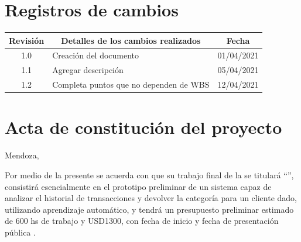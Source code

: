 \documentclass[11pt]{charter}
\begin{document}
\maketitle
\thispagestyle{empty}
\pagebreak


\thispagestyle{empty}
{\setlength{\parskip}{0pt}
\tableofcontents{}
}
\pagebreak


\section{Registros de cambios}
\label{sec:registro}


\begin{table}[ht]
\label{tab:registro}
\centering
\begin{tabularx}{\linewidth}{@{}|c|X|c|@{}}
\hline
\rowcolor[HTML]{C0C0C0} 
Revisión & \multicolumn{1}{c|}{\cellcolor[HTML]{C0C0C0}Detalles de los cambios realizados} & Fecha      \\ \hline
1.0      & Creación del documento                                          & 01/04/2021 \\ \hline
1.1      & Agregar descripción                                          & 05/04/2021 \\ \hline
1.2      & Completa puntos que no dependen de WBS                       & 12/04/2021 \\ \hline
\end{tabularx}
\end{table}

\pagebreak



\section{Acta de constitución del proyecto}
\label{sec:acta}

\begin{flushright}
Mendoza, \fechaInicioName
\end{flushright}

\vspace{2cm}

Por medio de la presente se acuerda con \authorname\hspace{1px} que su trabajo final de la \degreename\hspace{1px} 
se titulará ``\ttitle'', consistirá esencialmente en el prototipo preliminar de un sistema capaz de analizar el historial de 
transacciones y devolver la categoría para un cliente dado, utilizando aprendizaje automático, y tendrá un presupuesto 
preliminar estimado de 600 hs de trabajo y USD1300, con fecha de inicio \fechaInicioName\hspace{1px} y fecha de presentación 
pública \fechaFinalName.
\end{document}
